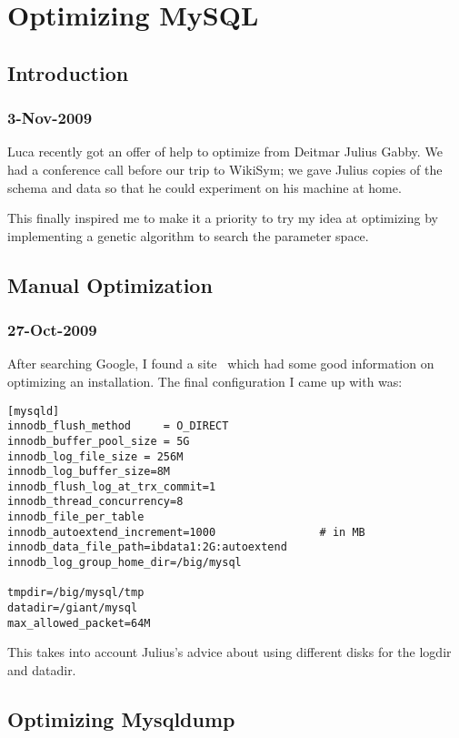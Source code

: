 \chapter{Optimizing MySQL}

\section{Introduction}

\subsection{3-Nov-2009}

Luca recently got an offer of help to optimize \mysql from Deitmar Julius Gabby.
We had a conference call before our trip to WikiSym; we gave Julius copies
of the schema and data so that he could experiment on his machine at home.

This finally inspired me to make it a priority to try my idea at optimizing
\mysql by implementing a genetic algorithm to search the parameter space.


\section{Manual Optimization}

\subsection{27-Oct-2009}

After searching Google, I found a site~\cite{InnodbOpt} which had some
good information on optimizing an  installation.
The final configuration I came up with was:
\begin{verbatim}
[mysqld]
innodb_flush_method     = O_DIRECT
innodb_buffer_pool_size = 5G
innodb_log_file_size = 256M
innodb_log_buffer_size=8M
innodb_flush_log_at_trx_commit=1
innodb_thread_concurrency=8
innodb_file_per_table
innodb_autoextend_increment=1000                # in MB
innodb_data_file_path=ibdata1:2G:autoextend
innodb_log_group_home_dir=/big/mysql

tmpdir=/big/mysql/tmp
datadir=/giant/mysql
max_allowed_packet=64M
\end{verbatim}
This takes into account Julius's advice about using different disks
for the logdir and datadir.

\section{Optimizing Mysqldump}

